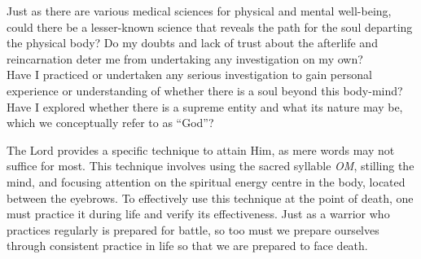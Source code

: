 

\newpage
\begin{mananam}{}
\normalfont\mananamtext Just as there are various medical sciences for physical and mental well-being, could there be a lesser-known science that reveals the path for the soul departing the physical body? Do my doubts and lack of trust about the afterlife and reincarnation deter me from undertaking any investigation on my own?\\
Have I practiced or undertaken any serious investigation to gain personal experience or understanding of whether there is a soul beyond this body-mind? Have I explored whether there is a supreme entity and what its nature may be, which we conceptually refer to as “God”?
\end{mananam}
\sreflect
\begin{inspiration}{}
\normalfont\mananamtext The Lord provides a specific technique to attain Him, as mere words may not suffice for most. This technique involves using the sacred syllable \emph{OM}, stilling the mind, and focusing attention on the spiritual energy centre in the body, located between the eyebrows. To effectively use this technique at the point of death, one must practice it during life and verify its effectiveness. Just as a warrior who practices regularly is prepared for battle, so too must we prepare ourselves through consistent practice in life so that we are prepared to face death.
\end{inspiration}
\newpage

